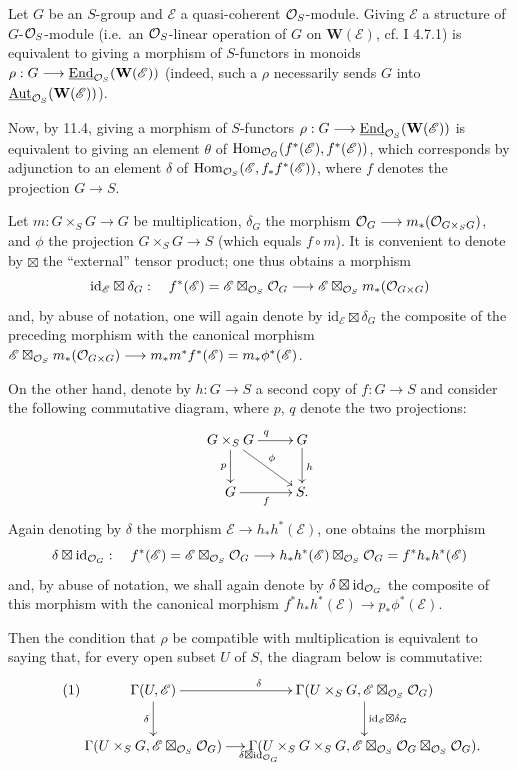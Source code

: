 \label{VIB.11.6}
Let $G$ be an $S$-group and $\mathscr E$ a quasi-coherent $\mathcal{O}_S$-module. Giving $\mathscr E$ a structure of $G$-$\mathcal{O}_S$-module (i.e.\ an $\mathcal{O}_S$-linear operation of $G$ on $\mathbf W(\mathscr E)$, cf. I 4.7.1) is equivalent to giving a morphism of $S$-functors in monoids $\rho:G\longrightarrow\underline{\operatorname{End}}_{\mathcal{O}_S}(\mathbf W(\mathscr E))$ (indeed, such a $\rho$ necessarily sends $G$ into $\underline{\operatorname{Aut}}_{\mathcal{O}_S}(\mathbf W(\mathscr E))$).

Now, by 11.4, giving a morphism of $S$-functors $\rho:G\longrightarrow\underline{\operatorname{End}}_{\mathcal{O}_S}(\mathbf W(\mathscr E))$ is equivalent to giving an element $\theta$ of $\operatorname{Hom}_{\mathcal{O}_G}(f^*(\mathscr E),f^*(\mathscr E))$, which corresponds by adjunction to an element $\delta$ of $\operatorname{Hom}_{\mathcal{O}_S}(\mathscr E,f_*f^*(\mathscr E))$, where $f$ denotes the projection $G\to S$.

Let $m:G\times_S G\to G$ be multiplication, $\delta_G$ the morphism $\mathcal{O}_G\longrightarrow m_*(\mathcal{O}_{G\times_S G})$, and $\phi$ the projection $G\times_S G\to S$ (which equals $f\circ m$). It is convenient to denote by $\boxtimes$ the ``external'' tensor product; one thus obtains a morphism
\[
\mathrm{id}_{\mathscr E}\boxtimes\delta_G:\quad f^*(\mathscr E)=\mathscr E\boxtimes_{\mathcal{O}_S}\mathcal{O}_G\longrightarrow\mathscr E\boxtimes_{\mathcal{O}_S}m_*(\mathcal{O}_{G\times G})
\]
and, by abuse of notation, one will again denote by $\mathrm{id}_{\mathscr E}\boxtimes\delta_G$ the composite of the preceding morphism with the canonical morphism $\mathscr E\boxtimes_{\mathcal{O}_S}m_*(\mathcal{O}_{G\times G})\longrightarrow m_*m^*f^*(\mathscr E)=m_*\phi^*(\mathscr E)$.

On the other hand, denote by $h:G\to S$ a second copy of $f:G\to S$ and consider the following commutative diagram, where $p$, $q$ denote the two projections:
\[
\xymatrix{G\times_S G\ar[r]^q\ar[d]_p\ar[dr]^\phi&G\ar[d]^h\\G\ar[r]_f&S.}
\]
Again denoting by $\delta$ the morphism $\mathscr E\to h_*h^*(\mathscr E)$, one obtains the morphism
\[
\delta\boxtimes\mathrm{id}_{\mathcal{O}_G}:\quad f^*(\mathscr E)=\mathscr E\boxtimes_{\mathcal{O}_S}\mathcal{O}_G\longrightarrow h_*h^*(\mathscr E)\boxtimes_{\mathcal{O}_S}\mathcal{O}_G=f^*h_*h^*(\mathscr E)
\]
and, by abuse of notation, we shall again denote by $\delta\boxtimes\mathrm{id}_{\mathcal{O}_G}$ the composite of this morphism with the canonical morphism $f^*h_*h^*(\mathscr E)\to p_*\phi^*(\mathscr E)$.

Then the condition that $\rho$ be compatible with multiplication is equivalent to saying that, for every open subset $U$ of $S$, the diagram below is commutative:
\begin{equation*}\tag{1}
\xymatrix@C=13pt{\Gamma(U,\mathscr E)\ar[r]^\delta\ar[d]_\delta&\Gamma(U\times_S G,\mathscr E\boxtimes_{\OS}\OO_G)\ar[d]^{\mathrm{id}_{\mathscr E}\boxtimes\delta_G}\\\Gamma(U\times_S G,\mathscr E\boxtimes_{\OS}\OO_G)\ar[r]_{\delta\boxtimes\mathrm{id}_{\OO_G}}&\Gamma(U\times_S G\times_S G,\mathscr E\boxtimes_{\OS}\OO_G\boxtimes_{\OS}\OO_G).}
\end{equation*}

